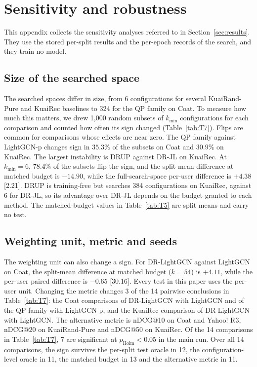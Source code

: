 \section{Sensitivity and robustness}\label{app:sens}

This appendix collects the sensitivity analyses referred to in Section~\ref{sec:results}. They use the stored
per-split results and the per-epoch records of the search, and they train no model.

\subsection{Size of the searched space}\label{sec:res-budget}

The searched spaces differ in size, from 6 configurations for several KuaiRand-Pure and KuaiRec baselines to 324 for
the QP family on Coat. To measure how much this matters, we drew 1,000 random subsets of $k_\mathrm{min}$
configurations for each comparison and counted how often its sign changed (Table~\ref{tab:T7}). Flips are common for
comparisons whose effects are near zero. The QP family against LightGCN-p changes sign in $35.3\%$ of the subsets on
Coat and $30.9\%$ on KuaiRec. The largest instability is DRUP against DR-JL on KuaiRec. At $k_\mathrm{min}=6$, $78.4\%$
of the subsets flip the sign, and the split-mean difference at matched budget is $-14.90$, while the full-search-space
per-user difference is $+4.38$ [2.21]. DRUP is training-free but searches 384 configurations on KuaiRec, against 6 for
DR-JL, so its advantage over DR-JL depends on the budget granted to each method. The matched-budget values in
Table~\ref{tab:T5} are split means and carry no test.



\subsection{Weighting unit, metric and seeds}

The weighting unit can also change a sign. For DR-LightGCN against LightGCN on Coat, the split-mean difference at
matched budget ($k=54$) is $+4.11$, while the per-user paired difference is $-0.65$ [30.16]. Every test in this paper
uses the per-user unit. Changing the metric changes 3 of the 14 pairwise conclusions in Table~\ref{tab:T7}: the Coat
comparisons of DR-LightGCN with LightGCN and of the QP family with LightGCN-p, and the KuaiRec comparison of
DR-LightGCN with LightGCN. The alternative metric is nDCG@10 on Coat and Yahoo! R3, nDCG@20 on KuaiRand-Pure and
nDCG@50 on KuaiRec. Of the 14 comparisons in Table~\ref{tab:T7}, 7 are significant at $p_\mathrm{Holm}<0.05$ in the
main run. Over all 14 comparisons, the sign survives the per-split test oracle in 12, the configuration-level oracle in
11, the matched budget in 13 and the alternative metric in 11.

